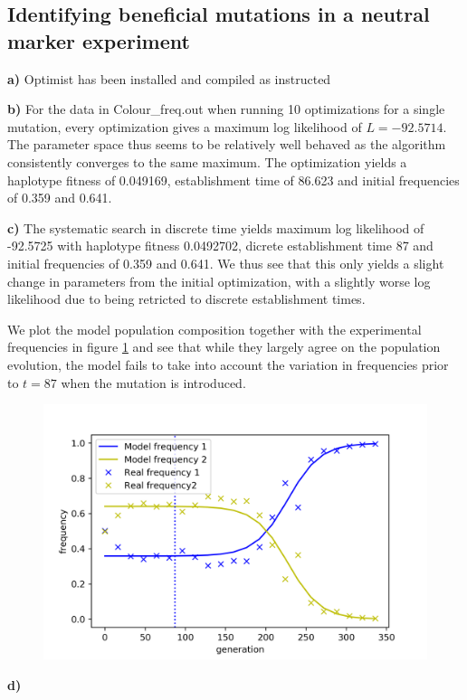 \documentclass{article}
\begin{document}
\subsection{Identifying beneficial mutations in a neutral marker experiment}

\textbf{a)} Optimist has been installed and compiled as instructed

\textbf{b)}
For the data in Colour\_freq.out when running 10 optimizations for a single mutation, every optimization gives a maximum log likelihood of $L = -92.5714$. The parameter space thus seems to be relatively well behaved as the algorithm consistently converges to the same maximum. The optimization yields a haplotype fitness of 0.049169, establishment time of 86.623 and initial frequencies of 0.359 and 0.641.

\textbf{c)}
The systematic search in discrete time yields maximum log likelihood of -92.5725 with haplotype fitness 0.0492702, dicrete establishment time 87 and initial frequencies of 0.359 and 0.641. We thus see that this only yields a slight change in parameters from the initial optimization, with a slightly worse log likelihood due to being retricted to discrete establishment times.

We plot the model population composition together with the experimental frequencies in figure \ref{fig:mut1_s} and see that while they largely agree on the population evolution, the model fails to take into account the variation in frequencies prior to $t=87$ when the mutation is introduced.

\begin{figure}[h]
		\centering
		\includegraphics[width = 0.5\linewidth, trim={0 0 0 0}, clip=true]{fit_mut1.png}
\label{fig:mut1_s}
\end{figure}

\textbf{d)}
\end{document}
